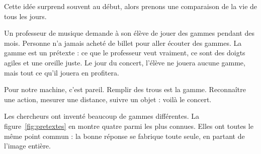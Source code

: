 Cette idée surprend souvent au début, alors prenons une comparaison de la vie
de tous les jours.

\begin{intuition}
Un professeur de musique demande à son élève de jouer des gammes pendant des
mois. Personne n'a jamais acheté de billet pour aller écouter des gammes. La
gamme est un prétexte : ce que le professeur veut vraiment, ce sont des
doigts agiles et une oreille juste. Le jour du concert, l'élève ne jouera
aucune gamme, mais tout ce qu'il jouera en profitera.

Pour notre machine, c'est pareil. Remplir des trous est la gamme. Reconnaître
une action, mesurer une distance, suivre un objet : voilà le concert.
\end{intuition}

Les chercheurs ont inventé beaucoup de gammes différentes. La
figure~\ref{fig:pretextes} en montre quatre parmi les plus connues. Elles ont
toutes le même point commun : la bonne réponse se fabrique toute seule, en
partant de l'image entière.

